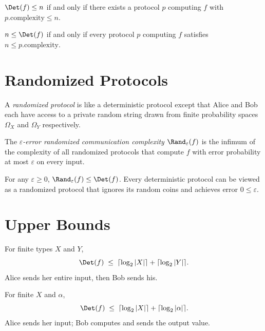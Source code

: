 \begin{lemma}
  \label{lem:det_cc_le_iff}
  \leanok
  $\Det(f) \le n$ if and only if there exists a protocol $p$ computing $f$ with
  $p.\mathrm{complexity} \le n$.
\end{lemma}

\begin{lemma}
  \label{lem:le_det_cc_iff}
  \leanok
  $n \le \Det(f)$ if and only if every protocol $p$ computing $f$ satisfies
  $n \le p.\mathrm{complexity}$.
\end{lemma}

\section{Randomized Protocols}

\begin{definition}
  \label{def:rand_protocol}
  \leanok
  A \emph{randomized protocol} is like a deterministic protocol except that
  Alice and Bob each have access to a private random string drawn from finite
  probability spaces $\Omega_X$ and $\Omega_Y$ respectively.
\end{definition}

\begin{definition}
  \label{def:rand_cc}
  \leanok
  The \emph{$\varepsilon$-error randomized communication complexity} $\Rand_\varepsilon(f)$
  is the infimum of the complexity of all randomized protocols that compute $f$
  with error probability at most $\varepsilon$ on every input.
\end{definition}

\begin{theorem}
  \label{thm:rand_le_det}
  \leanok
  For any $\varepsilon \ge 0$, $\Rand_\varepsilon(f) \le \Det(f)$.
  Every deterministic protocol can be viewed as a randomized protocol that
  ignores its random coins and achieves error $0 \le \varepsilon$.
\end{theorem}

\section{Upper Bounds}

\begin{theorem}
  \label{thm:det_cc_le_clog}
  \leanok
  For finite types $X$ and $Y$,
  \[
    \Det(f) \;\le\; \lceil \log_2 |X| \rceil + \lceil \log_2 |Y| \rceil.
  \]
  Alice sends her entire input, then Bob sends his.
\end{theorem}

\begin{theorem}
  \label{thm:det_cc_le_clog_X_alpha}
  \leanok
  For finite $X$ and $\alpha$,
  \[
    \Det(f) \;\le\; \lceil \log_2 |X| \rceil + \lceil \log_2 |\alpha| \rceil.
  \]
  Alice sends her input; Bob computes and sends the output value.
\end{theorem}
